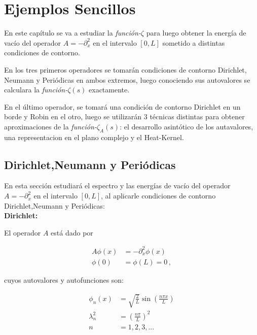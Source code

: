 \chapter{Ejemplos Sencillos}

En este capítulo se va a estudiar la {\it función-$\zeta$} para luego obtener la energía de vacío del operador $A = - \partial ^2 _x$ en el intervalo $[0,L]$ sometido a distintas condiciones de contorno. 

En los tres primeros operadores se tomarán condiciones de contorno Dirichlet, Neumann y Periódicas en ambos extremos, luego conociendo sus autovalores  se calculara la {\it función-$\zeta  (s)$} exactamente. 

En el último operador, se tomará una condición de contorno Dirichlet en un borde y Robin en el otro, luego se utilizarán 3 técnicas distintas para obtener aproximaciones de la {\it función-$\zeta _A (s)$}: el desarrollo asintótico de los autavalores, una representacion en el plano complejo  y el Heat-Kernel.

\section{Dirichlet,Neumann y Periódicas}

En esta sección estudiará el espectro y las energías de vacío del operador $A = - \partial ^2 _x$ en el intervalo $[0,L]$, al aplicarle condiciones de contorno Dirichlet,Neumann y Periódicas:\\

\textbf{Dirichlet:}


El operador $A$ está dado por

\begin{equation}
\begin{aligned}
	A \phi (x) &= - \partial _x ^2 \phi (x) \\[10pt]
    \phi (0) &= \phi(L) = 0 
    \, ,
\end{aligned}
\end{equation}



cuyos autovalores y autofunciones son: 

\begin{equation}
\begin{aligned}
	\phi _n (x) &= \sqrt{\frac{2}{L}} \sin( \frac{n \pi x}{L} ) \\[10pt]
	\lambda _n ^2 &= \left( \frac{n \pi }{L} \right) ^2 \\[10pt]
	n &= 1,2,3, ...
\end{aligned}
\end{equation}


